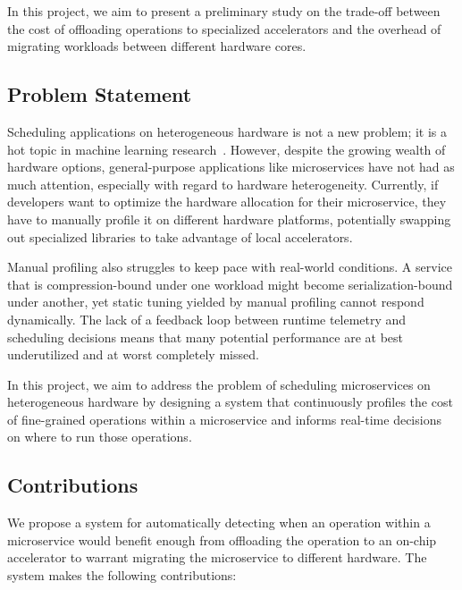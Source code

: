 In this project, we aim to present a preliminary study on the trade-off between the cost of offloading operations to specialized accelerators and the overhead of migrating workloads between different hardware cores.

\subsection{Problem Statement}

Scheduling applications on heterogeneous hardware is not a new problem; it is a hot topic in machine learning research~\cite{narayanan2023hetero,subramanya2023sia}.
However, despite the growing wealth of hardware options, general-purpose applications like microservices have not had as much attention, especially with regard to hardware heterogeneity.
Currently, if developers want to optimize the hardware allocation for their microservice, they have to manually profile it on different hardware platforms, potentially swapping out specialized libraries to take advantage of local accelerators.

Manual profiling also struggles to keep pace with real-world conditions.
A service that is compression-bound under one workload might become serialization-bound under another, yet static tuning yielded by manual profiling cannot respond dynamically.
The lack of a feedback loop between runtime telemetry and scheduling decisions means that many potential performance are at best underutilized and at worst completely missed.

In this project, we aim to address the problem of scheduling microservices on heterogeneous hardware by designing a system that continuously profiles the cost of fine-grained operations within a microservice and informs real-time decisions on where to run those operations.


\subsection{Contributions}

We propose a system for automatically detecting when an operation within a microservice would benefit enough from offloading the operation to an on-chip accelerator to warrant migrating the microservice to different hardware.
The system makes the following contributions:

